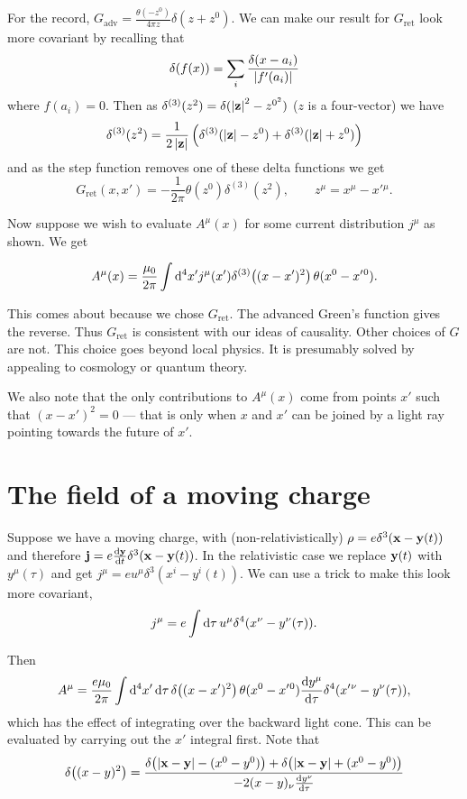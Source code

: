 \documentclass{notes}
\newcommand{\jc}{\vect{j}}
\begin{document}
For the record, $G_{\text{adv}} = \frac{\theta(-z^0)}{4 \pi z}
\delta(z+z^0)$.  We can make our result for $G_{\text{ret}}$
look more covariant by recalling that
\[
\delta(f(x)) = \sum_i \frac{\delta(x-a_i)}{\left|f'(a_i)\right|}
\]
where $f(a_i) = 0$.  Then as
$\delta^{(3)} (z^2) = \delta(\left|\mathbf{z}\right|^2 - z^{0^2})$ ($z$
is a four-vector) we have
\[
\delta^{(3)}(z^2) = \frac{1}{2 \left|\mathbf{z}\right|}
\left( \delta^{(3)}(\left|\mathbf{z}\right| - z^0) + \delta^{(3)}(
\left|\mathbf{z}\right| + z^0) \right)
\]
and as the step function removes one of these delta functions we get
\[
G_{\text{ret}}(x,x') = - \frac{1}{2 \pi} \theta(z^0)
\delta^{(3)}(z^2), \qquad z^\mu = x^\mu - x'{}^\mu.
\]

Now suppose we wish to evaluate $A^\mu(x)$ for some current
distribution $j^\mu$ as shown.  We get

\[
A^\mu(x) = \frac{\mu_0}{2 \pi} \int \mathrm{d}^4 x'
j^\mu(x') \delta^{(3)}\!\left((x - x')^2\right) \theta(x^0 - x'{}^0).
\]

\vspace{1.5in}

This comes about because we chose $G_{\text{ret}}$.  The advanced
Green's function gives the reverse.  Thus $G_{\text{ret}}$ is
consistent with our ideas of causality.  Other choices of $G$
are not.  This choice goes beyond local physics.  It is presumably
solved by appealing to cosmology or quantum theory.

We also note that the only contributions to $A^\mu(x)$ come from
points $x'$ such that $(x-x')^2 = 0$ --- that is only when
$x$ and $x'$ can be joined by a light ray pointing towards the future of
$x'$.

\section{The field of a moving charge}

Suppose we have a moving charge, with (non-relativistically)
$\rho = e \delta^3(\mathbf{x} - \mathbf{y}(t))$ and therefore
$\jc = e \diff{\vect{y}}{t} \delta^3(\vx - \vect{y}(t))$.  In the relativistic
case we replace $\mathbf{y}(t)$ with $y^\mu(\tau)$ and get
$j^\mu = e u^\mu \delta^3(x^i - y^i(t))$.  We can use a trick to make this
look more covariant,
\[
j^\mu = e \int \mathrm{d} \tau\, u^\mu \delta^4(x^\nu - y^\nu(\tau)).
\]

Then
\[
A^\mu = \frac{e \mu_0}{2 \pi} \int \mathrm{d}^4 x'\, \mathrm{d} \tau \,
\delta\!\left((x-x')^2\right) \theta(x^0 - x'{}^0) \frac{\mathrm{d} y^\mu}{\mathrm{d}\tau}
\delta^4(x'{}^\nu - y^\nu(\tau)),
\]
which has the effect of integrating over the backward light cone.  This can
be evaluated by carrying out the $x'$ integral first.  Note that
\[
\delta\!\left((x-y)^2\right) = \frac{\delta\!\left(\left|\mathbf{x} - \mathbf{y}\right|
- (x^0 - y^0)\right) + \delta\!\left(\left|\mathbf{x} - \mathbf{y}\right|
+ (x^0 - y^0) \right)}{-2 (x-y)_\nu \frac{\mathrm{d} y^\nu}{\mathrm{d}\tau}}
\]
\end{document}

